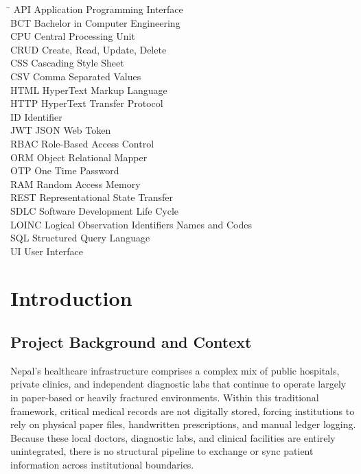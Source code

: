 \documentclass[12pt, a4paper]{report}
\numberwithin{equation}{chapter}
\begin{document}
\begin{tabbing}
\hspace{3cm} \= \kill
API \> Application Programming Interface \\
BCT \> Bachelor in Computer Engineering \\
CPU \> Central Processing Unit \\
CRUD \> Create, Read, Update, Delete \\
CSS \> Cascading Style Sheet \\
CSV \> Comma Separated Values \\
HTML \> HyperText Markup Language \\
HTTP \> HyperText Transfer Protocol \\
ID \> Identifier \\
JWT \> JSON Web Token \\
RBAC \> Role-Based Access Control \\
ORM \> Object Relational Mapper \\
OTP \> One Time Password \\
RAM \> Random Access Memory \\
REST \> Representational State Transfer \\
SDLC \> Software Development Life Cycle \\
LOINC \> Logical Observation Identifiers Names and Codes \\
SQL \> Structured Query Language \\
UI \> User Interface \\

\end{tabbing}

\newpage

\setcounter{page}{1}

\chapter{Introduction}

\section{Project Background and Context}

Nepal’s healthcare infrastructure comprises a complex mix of public hospitals, private clinics, and independent diagnostic labs that continue to operate largely in paper-based or heavily fractured environments. Within this traditional framework, critical medical records are not digitally stored, forcing institutions to rely on physical paper files, handwritten prescriptions, and manual ledger logging. Because these local doctors, diagnostic labs, and clinical facilities are entirely unintegrated, there is no structural pipeline to exchange or sync patient information across institutional boundaries. 
\end{document}
